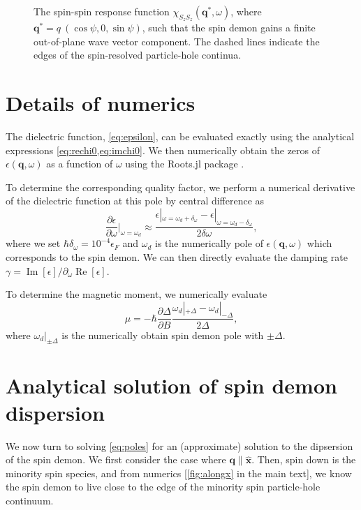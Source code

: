 \documentclass[aps,prb,reprint,twocolumns,superscriptaddress,nofootinbib]{revtex4-2}
\DeclareMathOperator{\Imm}{Im}
\DeclareMathOperator{\Ree}{Re}
\newcommand{\xx}{\hat{\bm{x}}}
\begin{document}
\begin{figure}
		\caption{The spin-spin response function $\chi_{S_zS_z}(\bm q^*,\omega)$, where $\bm q^*=q\ (\cos\psi,0,\sin\psi)$, such that the spin demon gains a finite out-of-plane wave vector component. The dashed lines indicate the edges of the spin-resolved particle-hole continua. \label{fig:oop}}
	\end{figure}
	
	
	\section{Details of numerics}
	\label{sec:numerics}
	The dielectric function, \cref{eq:epsilon}, can be evaluated exactly using the analytical expressions \cref{eq:rechi0,eq:imchi0}. We then numerically obtain the zeros of $\epsilon(\bm q,\omega)$ as a function of $\omega$ using the Roots.jl package \cite{Roots.jl}.
	

	To determine the corresponding quality factor, we perform a numerical derivative of the dielectric function at this pole by central difference as
	\begin{equation}
		\frac{\partial\epsilon}{\partial\omega}\big|_{\omega=\omega_{d}} \approx \frac{\epsilon|_{\omega=\omega_{d}+\delta_\omega}-\epsilon|_{\omega=\omega_{d}-\delta_\omega}}{2\delta\omega},
	\end{equation}
	where we set $\hbar\delta_\omega=10^{-4}\epsilon_F$ and $\omega_d$ is the numerically pole of $\epsilon(\bm q,\omega)$ which corresponds to the spin demon. We can then directly evaluate the damping rate $\gamma=\Imm[\epsilon]/\partial_\omega\Ree[\epsilon]$.
	
	To determine the magnetic moment, we numerically evaluate
	\begin{equation}
		\mu = -\hbar\frac{\partial\Delta}{\partial B} \frac{\omega_d|_{+\Delta}-\omega_d|_{-\Delta}}{2\Delta},
	\end{equation}
	where $\omega_d|_{\pm\Delta}$ is the numerically obtain spin demon pole with $\pm\Delta$.
	
	

	\section{Analytical solution of spin demon dispersion}
	We now turn to solving \cref{eq:poles} for an (approximate) solution to the dipsersion of the spin demon. 	
	We first consider the case where $\bm q\parallel \xx$. Then, spin down is the minority spin species, and from numerics [\cref{fig:alongx} in the main text], we know the spin demon to live close to the edge of the minority spin particle-hole continuum.
	
\end{document}

